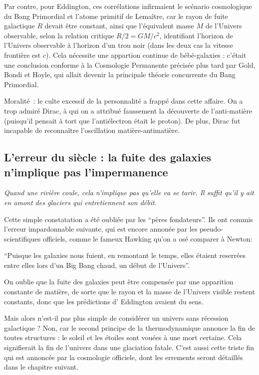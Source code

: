 \documentclass[a4paper,12pt]{article}
\begin{document}
     Par contre, pour Eddington, ces corrélations infirmaient le scénario cosmologique du Bang Primordial et l'atome primitif de Lemaître, car le rayon de fuite galactique $R$ devait être constant, ainsi que l'équivalent masse $M$ de l'Univers observable, selon la relation critique  $R/2 = GM/c^2$, identifiant l'horizon de l'Univers observable à l'horizon d'un trou noir (dans les deux cas la vitesse frontière est $c$). Cela nécessite une appartion continue de bébé-galaxies : c'était une conclusion conforme à la Cosmologie Permanente précisée plus tard par Gold, Bondi et Hoyle, qui allait devenir la principale théorie concurrente du Bang Primordial. 

Moralité : le culte excessif de la personnalité a frappé dans cette affaire. On a trop admiré Dirac, à qui on a attribué faussement la découverte de l’anti-matière (puisqu’il pensait à tort que l’antiélectron était le proton). De plus, Dirac fut incapable de reconnaître l'oscillation matière-antimatière.


\subsection{L'erreur du siècle : la fuite des galaxies n'implique pas l'impermanence}

    \textit{ Quand une rivière coule, cela n'implique pas qu'elle va se tarir. Il suffit qu'il y ait en amont des glaciers qui entretiennent son débit.}
     

Cette simple constatation a été oubliée par les ``pères fondateurs''. Ils ont commis l'erreur impardonnable suivante, qui est encore annonée par les pseudo-scientifiques officiels, comme le fameux Hawking qu'on a osé comparer à Newton:

``Puisque les galaxies nous fuient, en remontant le temps, elles étaient reserrées entre elles lors d'un Big Bang chaud, un début de l'Univers''.

On oublie que la fuite des galaxies peut être compensée par une apparition constante de matière, de sorte que le rayon et la masse de l'Univers visible restent constants, donc que les prédictions d' Eddington avaient du sens.

Mais alors n'est-il pas plus simple de considérer un univers sans récession galactique ? Non, car le second principe de la thermodynamique annonce la fin de toutes structures : le soleil et les étoiles sont vouées à une mort certaine. Cela signifierait la fin de l'univers dans une glaciation fatale.  C'est aussi cette triste fin qui est annoncée par la cosmologie officiele, dont les errements seront détaillés dans le chapitre suivant.
\end{document}
